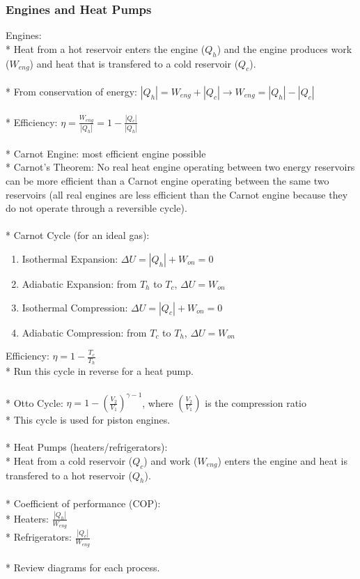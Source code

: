 \subsubsection{Engines and Heat Pumps}
Engines:\\*
Heat from a hot reservoir enters the engine (\(Q_h\)) and the engine produces work (\(W_{eng}\)) and heat that is transfered to a cold reservoir (\(Q_c\)).\\\\*
From conservation of energy: \(\left|Q_h\right|=W_{eng}+\left|Q_c\right|\rightarrow W_{eng}=\left|Q_h\right|-\left|Q_c\right|\)\\\\*
Efficiency: \(\displaystyle\eta=\frac{W_{eng}}{\left|Q_h\right|}=1-\frac{\left|Q_c\right|}{\left|Q_h\right|}\)\\\\*
Carnot Engine: most efficient engine possible\\*
Carnot's Theorem: No real heat engine operating between two energy reservoirs can be more efficient than a Carnot engine operating between the same two reservoirs (all real engines are less efficient than the Carnot engine because they do not operate through a reversible cycle).\\\\*
Carnot Cycle (for an ideal gas):
\begin{enumerate}
\item Isothermal Expansion: \(\Delta U=\left|Q_h\right|+W_{on}=0\)
\item Adiabatic Expansion: from \(T_h\) to \(T_c\), \(\Delta U=W_{on}\)
\item Isothermal Compression: \(\Delta U=\left|Q_c\right|+W_{on}=0\)
\item Adiabatic Compression: from \(T_c\) to \(T_h\), \(\Delta U=W_{on}\)
\end{enumerate}
Efficiency: \(\displaystyle\eta=1-\frac{T_c}{T_h}\)\\*
Run this cycle in reverse for a heat pump.\\\\*
Otto Cycle: \(\displaystyle\eta=1-\left(\frac{V_2}{V_1}\right)^{\gamma-1}\), where \(\displaystyle\left(\frac{V_2}{V_1}\right)\) is the compression ratio\\*
This cycle is used for piston engines.\\\\*
%
Heat Pumps (heaters/refrigerators):\\*
Heat from a cold reservoir (\(Q_c\)) and work (\(W_{eng}\)) enters the engine and heat is transfered to a hot reservoir (\(Q_h\)).\\\\*
Coefficient of performance (COP):\\*
Heaters: \(\displaystyle \frac{\left|Q_h\right|}{W_{eng}}\)\\*
Refrigerators: \(\displaystyle \frac{\left|Q_c\right|}{W_{eng}}\)\\\\*
%
Review diagrams for each process.

